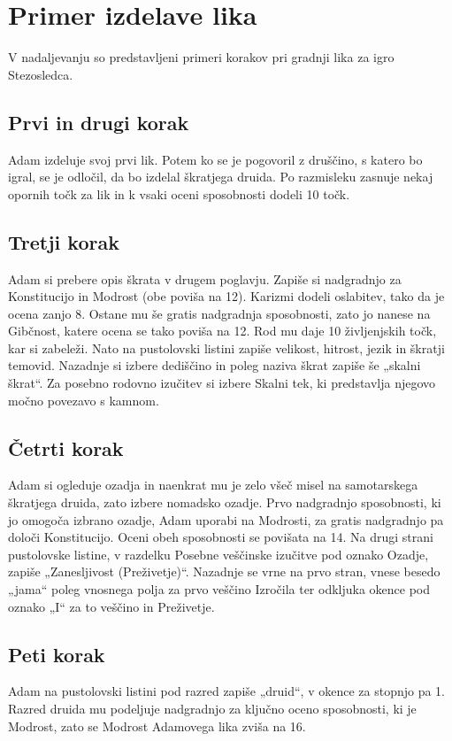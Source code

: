 \section{Primer izdelave lika}
V nadaljevanju so predstavljeni primeri korakov pri gradnji lika za igro Stezosledca.

\subsection{Prvi in drugi korak}
Adam izdeluje svoj prvi lik. Potem ko se je pogovoril z druščino, s katero bo igral, se je odločil, da bo izdelal škratjega druida. Po razmisleku zasnuje nekaj opornih točk za lik in k vsaki oceni sposobnosti dodeli 10 točk.

\subsection{Tretji korak}
Adam si prebere opis škrata v drugem poglavju. Zapiše si nadgradnjo za Konstitucijo in Modrost (obe poviša na 12). Karizmi dodeli oslabitev, tako da je ocena zanjo 8. Ostane mu še gratis nadgradnja sposobnosti, zato jo nanese na Gibčnost, katere ocena se tako poviša na 12. Rod mu daje 10 življenjskih točk, kar si zabeleži. Nato na pustolovski listini zapiše velikost, hitrost, jezik in škratji temovid. Nazadnje si izbere dediščino in poleg naziva škrat zapiše še „skalni škrat“. Za posebno rodovno izučitev si izbere Skalni tek, ki predstavlja njegovo močno povezavo s kamnom.

\subsection{Četrti korak}
Adam si ogleduje ozadja in naenkrat mu je zelo všeč misel na samotarskega škratjega druida, zato izbere nomadsko ozadje. Prvo nadgradnjo sposobnosti, ki jo omogoča izbrano ozadje, Adam uporabi na Modrosti, za gratis nadgradnjo pa določi Konstitucijo. Oceni obeh sposobnosti se povišata na 14. Na drugi strani pustolovske listine, v razdelku Posebne veščinske izučitve pod oznako Ozadje, zapiše „Zanesljivost (Preživetje)“. Nazadnje se vrne na prvo stran, vnese besedo „jama“ poleg vnosnega polja za prvo veščino Izročila ter odkljuka okence pod oznako „I“ za to veščino in Preživetje.

\subsection{Peti korak}
Adam na pustolovski listini pod razred zapiše „druid“, v okence za stopnjo pa 1. Razred druida mu podeljuje nadgradnjo za ključno oceno sposobnosti, ki je Modrost, zato se Modrost Adamovega lika zviša na 16.

